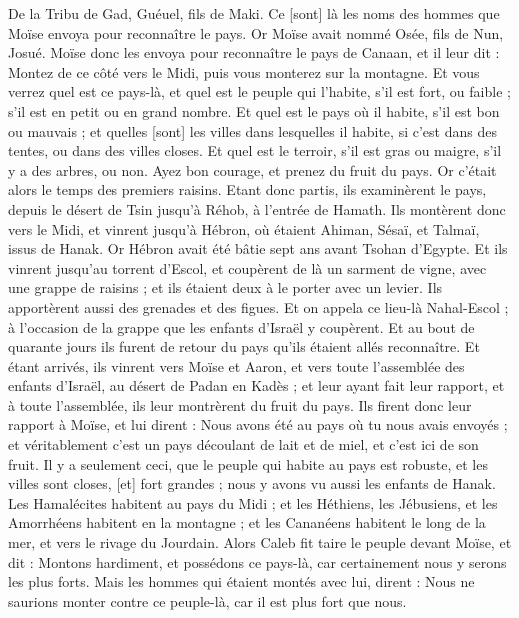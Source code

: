 \begin{multicols}{2}
De la Tribu de Gad, Guéuel, fils de Maki.
Ce [sont] là les noms des hommes que Moïse envoya pour reconnaître le pays. Or Moïse avait nommé Osée, fils de Nun, Josué.
Moïse donc les envoya pour reconnaître le pays de Canaan, et il leur dit : Montez de ce côté vers le Midi, puis vous monterez sur la montagne.
Et vous verrez quel est ce pays-là, et quel est le peuple qui l'habite, s'il est fort, ou faible ; s'il est en petit ou en grand nombre.
Et quel est le pays où il habite, s'il est bon ou mauvais ; et quelles [sont] les villes dans lesquelles il habite, si c'est dans des tentes, ou dans des villes closes.
Et quel est le terroir, s'il est gras ou maigre, s'il y a des arbres, ou non. Ayez bon courage, et prenez du fruit du pays. Or c'était alors le temps des premiers raisins.
Etant donc partis, ils examinèrent le pays, depuis le désert de Tsin jusqu'à Réhob, à l'entrée de Hamath.
Ils montèrent donc vers le Midi, et vinrent jusqu'à Hébron, où étaient Ahiman, Sésaï, et Talmaï, issus de Hanak. Or Hébron avait été bâtie sept ans avant Tsohan d'Egypte.
Et ils vinrent jusqu'au torrent d'Escol, et coupèrent de là un sarment de vigne, avec une grappe de raisins ; et ils étaient deux à le porter avec un levier. Ils apportèrent aussi des grenades et des figues.
Et on appela ce lieu-là Nahal-Escol ; à l'occasion de la grappe que les enfants d'Israël y coupèrent.
Et au bout de quarante jours ils furent de retour du pays qu'ils étaient allés reconnaître.
Et étant arrivés, ils vinrent vers Moïse et Aaron, et vers toute l'assemblée des enfants d'Israël, au désert de Padan en Kadès ; et leur ayant fait leur rapport, et à toute l'assemblée, ils leur montrèrent du fruit du pays.
Ils firent donc leur rapport à Moïse, et lui dirent : Nous avons été au pays où tu nous avais envoyés ; et véritablement c'est un pays découlant de lait et de miel, et c'est ici de son fruit.
Il y a seulement ceci, que le peuple qui habite au pays est robuste, et les villes sont closes, [et] fort grandes ; nous y avons vu aussi les enfants de Hanak.
Les Hamalécites habitent au pays du Midi ; et les Héthiens, les Jébusiens, et les Amorrhéens habitent en la montagne ; et les Cananéens habitent le long de la mer, et vers le rivage du Jourdain.
Alors Caleb fit taire le peuple devant Moïse, et dit : Montons hardiment, et possédons ce pays-là, car certainement nous y serons les plus forts.
Mais les hommes qui étaient montés avec lui, dirent : Nous ne saurions monter contre ce peuple-là, car il est plus fort que nous.

\end{multicols}
